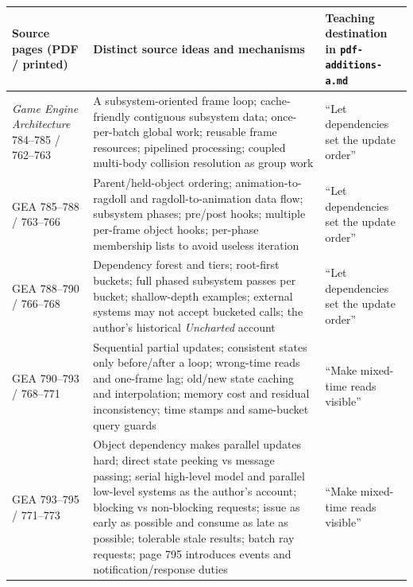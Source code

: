 {\def\LTcaptype{none} %
\begin{longtable}[]{@{}
  >{\raggedright\arraybackslash}p{}
  >{\raggedright\arraybackslash}p{}
  >{\raggedright\arraybackslash}p{}@{}}
\toprule\noalign{}
\begin{minipage}[b]{\linewidth}\raggedright
Source pages (PDF / printed)
\end{minipage} & \begin{minipage}[b]{\linewidth}\raggedright
Distinct source ideas and mechanisms
\end{minipage} & \begin{minipage}[b]{\linewidth}\raggedright
Teaching destination in \texttt{pdf-additions-a.md}
\end{minipage} \\
\midrule\noalign{}
\endhead
\bottomrule\noalign{}
\endlastfoot
\emph{Game Engine Architecture} 784--785 / 762--763 & A subsystem-oriented frame loop; cache-friendly contiguous subsystem data; once-per-batch global work; reusable frame resources; pipelined processing; coupled multi-body collision resolution as group work & ``Let dependencies set the update order'' \\
GEA 785--788 / 763--766 & Parent/held-object ordering; animation-to-ragdoll and ragdoll-to-animation data flow; subsystem phases; pre/post hooks; multiple per-frame object hooks; per-phase membership lists to avoid useless iteration & ``Let dependencies set the update order'' \\
GEA 788--790 / 766--768 & Dependency forest and tiers; root-first buckets; full phased subsystem passes per bucket; shallow-depth examples; external systems may not accept bucketed calls; the author's historical \emph{Uncharted} account & ``Let dependencies set the update order'' \\
GEA 790--793 / 768--771 & Sequential partial updates; consistent states only before/after a loop; wrong-time reads and one-frame lag; old/new state caching and interpolation; memory cost and residual inconsistency; time stamps and same-bucket query guards & ``Make mixed-time reads visible'' \\
GEA 793--795 / 771--773 & Object dependency makes parallel updates hard; direct state peeking vs message passing; serial high-level model and parallel low-level systems as the author's account; blocking vs non-blocking requests; issue as early as possible and consume as late as possible; tolerable stale results; batch ray requests; page 795 introduces events and notification/response duties & ``Make mixed-time reads visible'' \\

\end{longtable}}
